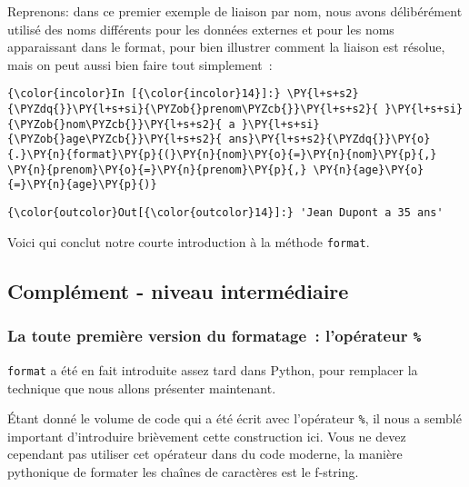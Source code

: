     Reprenons: dans ce premier exemple de liaison par nom, nous avons
délibérément utilisé des noms différents pour les données externes et
pour les noms apparaissant dans le format, pour bien illustrer comment
la liaison est résolue, mais on peut aussi bien faire tout simplement~:

    \begin{Verbatim}[commandchars=\\\{\},frame=single,framerule=0.3mm,rulecolor=\color{cellframecolor}]
{\color{incolor}In [{\color{incolor}14}]:} \PY{l+s+s2}{\PYZdq{}}\PY{l+s+si}{\PYZob{}prenom\PYZcb{}}\PY{l+s+s2}{ }\PY{l+s+si}{\PYZob{}nom\PYZcb{}}\PY{l+s+s2}{ a }\PY{l+s+si}{\PYZob{}age\PYZcb{}}\PY{l+s+s2}{ ans}\PY{l+s+s2}{\PYZdq{}}\PY{o}{.}\PY{n}{format}\PY{p}{(}\PY{n}{nom}\PY{o}{=}\PY{n}{nom}\PY{p}{,} \PY{n}{prenom}\PY{o}{=}\PY{n}{prenom}\PY{p}{,} \PY{n}{age}\PY{o}{=}\PY{n}{age}\PY{p}{)}
\end{Verbatim}


\begin{Verbatim}[commandchars=\\\{\},frame=single,framerule=0.3mm,rulecolor=\color{cellframecolor}]
{\color{outcolor}Out[{\color{outcolor}14}]:} 'Jean Dupont a 35 ans'
\end{Verbatim}
            
    Voici qui conclut notre courte introduction à la méthode
\texttt{format}.

    \hypertarget{compluxe9ment---niveau-intermuxe9diaire}{%
\subsection{Complément - niveau
intermédiaire}\label{compluxe9ment---niveau-intermuxe9diaire}}

    \hypertarget{la-toute-premiuxe8re-version-du-formatage-lopuxe9rateur}{%
\subsubsection{\texorpdfstring{La toute première version du formatage~:
l'opérateur
\texttt{\%}}{La toute première version du formatage~: l'opérateur \%}}\label{la-toute-premiuxe8re-version-du-formatage-lopuxe9rateur}}

    \texttt{format} a été en fait introduite assez tard dans Python, pour
remplacer la technique que nous allons présenter maintenant.

Étant donné le volume de code qui a été écrit avec l'opérateur
\texttt{\%}, il nous a semblé important d'introduire brièvement cette
construction ici. Vous ne devez cependant pas utiliser cet opérateur
dans du code moderne, la manière pythonique de formater les chaînes de
caractères est le f-string.

